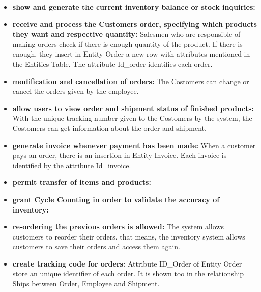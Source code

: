 \begin{itemize}
    \item \textbf{show and generate the current inventory balance or stock inquiries:}
    \item \textbf{receive and process the Customers order, specifying which products they want and respective quantity:} Salesmen who are responsible of making orders check if there is enough quantity of the product. If there is enough, they insert in Entity Order a new row with attributes mentioned in the Entities Table. The attribute Id\_order identifies each order.
    \item \textbf{modification and cancellation of orders:} The Costomers can change or cancel the orders given by the employee.
    \item \textbf{allow users to view order and shipment status of finished products:} With the unique tracking number given to the Costomers by the system, the Costomers can get information about the order and shipment.
    \item \textbf{generate invoice whenever payment has been made:} When a customer pays an order, there is an insertion in  Entity Invoice. Each invoice is identified by the attribute Id\_invoice.
    \item \textbf{permit transfer of items and products:}
    \item \textbf{grant Cycle Counting in order to validate the accuracy of inventory:}
    \item \textbf{re-ordering the previous orders is allowed:} The system allows customers to reorder their orders. that means, the inventory system allows customers to save their orders and access them again.
    \item \textbf{create tracking code for orders:} Attribute ID\_Order of Entity Order store an unique identifier of each order. It is shown too in the relationship Ships between Order, Employee and Shipment.
\end{itemize}




